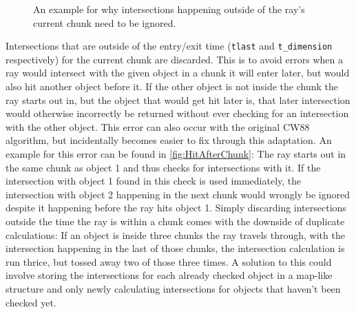 \begin{figure}[t!]
    
    \caption{An example for why intersections happening outside of the ray's current chunk need to be ignored.}\label{fig:HitAfterChunk}
\end{figure}
Intersections that are outside of the entry/exit time (\verb|tlast| and \verb|t_dimension| respectively) for the current chunk are discarded.
This is to avoid errors when a ray would intersect with the given object in a chunk it will enter later,
but would also hit another object before it.
If the other object is not inside the chunk the ray starts out in,
but the object that would get hit later is,
that later intersection would otherwise incorrectly be returned without ever checking for an intersection with the other object.
This error can also occur with the original CW88 algorithm,
but incidentally becomes easier to fix through this adaptation.
\newline
An example for this error can be found in \autoref{fig:HitAfterChunk}:
The ray starts out in the same chunk as object 1 and thus checks for intersections with it.
If the intersection with object 1 found in this check is used immediately,
the intersection with object 2 happening in the next chunk would wrongly be ignored despite it happening before the ray hits object 1.
\newline
Simply discarding intersections outside the time the ray is within a chunk comes with the downside of duplicate calculations:
If an object is inside three chunks the ray travels through, with the intersection happening in the last of those chunks,
the intersection calculation is run thrice, but tossed away two of those three times.
\newline
A solution to this could involve storing the intersections for each already checked object in a map-like structure
and only newly calculating intersections for objects that haven't been checked yet.
